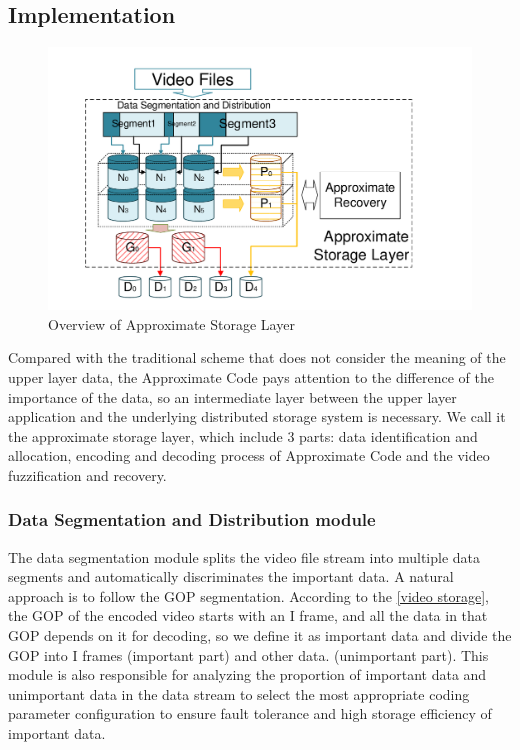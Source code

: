 \documentclass[sigconf]{acmart}
\begin{document}
\subsection{Implementation}\label{Implementation}
\begin{figure}[htb]
\centering
\includegraphics[width=0.8\linewidth]{photo/implementation-V2.pdf}
\caption{Overview of Approximate Storage Layer}
\label{fig-implementation}
\end{figure}

Compared with the traditional scheme that does not consider the meaning of the upper layer data, the Approximate Code pays attention to the difference of the importance of the data, so an intermediate layer between the upper layer application and the underlying distributed storage system is necessary. We call it the approximate storage layer, which include 3 parts: data identification and allocation, encoding and decoding process of Approximate Code and the video fuzzification and recovery.

\subsubsection{Data Segmentation and Distribution module}
The data segmentation module splits the video file stream into multiple data segments and automatically discriminates the important data. A natural approach is to follow the GOP segmentation. According to the \ref{video storage}, the GOP of the encoded video starts with an I frame, and all the data in that GOP depends on it for decoding, so we define it as important data and divide the GOP into I frames (important part) and other data. (unimportant part).
This module is also responsible for analyzing the proportion of important data and unimportant data in the data stream to select the most appropriate coding parameter configuration to ensure fault tolerance and high storage efficiency of important data.
\end{document}
